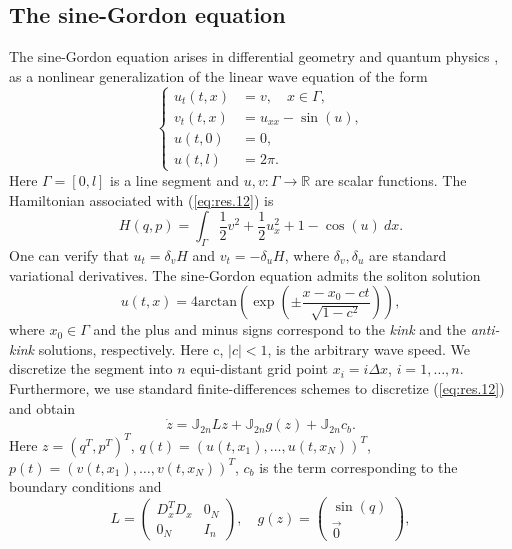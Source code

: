 \subsection{The sine-Gordon equation} \label{sec:res.2}
The sine-Gordon equation arises in differential geometry and quantum physics \cite{Misumi2015}, as a nonlinear generalization of the linear wave equation of the form
\begin{equation} \label{eq:res.12}
\left\{
\begin{aligned}
	u_{t}(t,x) &= v, \quad x\in \Gamma,\\
	v_t(t,x) &= u_{xx} - \sin(u), \\
	u(t,0) &= 0, \\
	u(t,l) &= 2\pi.
\end{aligned}
\right.
\end{equation}
Here $\Gamma = [0,l]$ is a line segment and $u,v: \Gamma \to \mathbb R$ are scalar functions. The Hamiltonian associated with (\ref{eq:res.12}) is
\begin{equation} \label{eq:res.13}
	H(q,p) = \int_{\Gamma} \frac 1 2 v^2 + \frac 1 2 u_x^2 + 1 - \cos(u) \ dx.
\end{equation}
One can verify that $u_{t} = \delta_v H$ and $v_{t} = - \delta_u H$, where $\delta_v,\delta_u$ are standard variational derivatives. The sine-Gordon equation admits the soliton solution
\begin{equation} \label{eq:res.14}
	u(t,x) = 4 \text{arctan}\left( \exp \left( \pm \frac{x - x_0 - ct}{\sqrt{1-c^2}} \right) \right),
\end{equation}
where $x_0 \in \Gamma$ and the plus and minus signs correspond to the \emph{kink} and the \emph{anti-kink} solutions, respectively. Here c, $|c|<1$, is the arbitrary wave speed. We discretize the segment into $n$ equi-distant grid point $x_i = i\Delta x$, $i=1,\dots,n$. Furthermore, we use standard finite-differences schemes to discretize (\ref{eq:res.12}) and obtain
\begin{equation} \label{eq:res.15}
	\dot z = \mathbb J_{2n} L z + \mathbb J_{2n} g(z) + \mathbb J_{2n} c_b.
\end{equation}
Here $z = (q^T,p^T)^T$, $q(t) = (u(t,x_1),\dots,u(t,x_N))^T$, $p(t) = (v(t,x_1),\dots,v(t,x_N))^T$, $c_b$ is the term corresponding to the boundary conditions and
\begin{equation} \label{eq:res.16}
	L = 
	\begin{pmatrix}
		D_x^TD_x & 0_N \\
		0_N & I_n
	\end{pmatrix}, 
	\quad
	g(z) = 
	\begin{pmatrix}
	\sin(q) \\
	\vec 0
	\end{pmatrix},
\end{equation}
